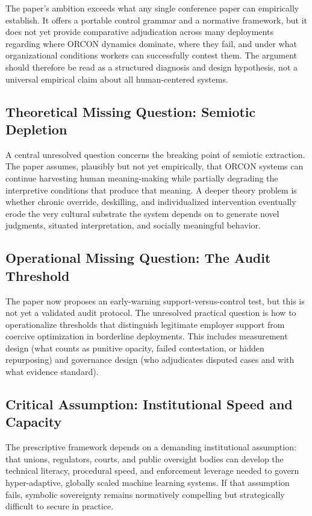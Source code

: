 \documentclass[runningheads]{llncs}
\begin{document}
The paper's ambition exceeds what any single conference paper can empirically establish. It offers a portable control grammar and a normative framework, but it does not yet provide comparative adjudication across many deployments regarding where ORCON dynamics dominate, where they fail, and under what organizational conditions workers can successfully contest them. The argument should therefore be read as a structured diagnosis and design hypothesis, not a universal empirical claim about all human-centered systems.

\subsection{Theoretical Missing Question: Semiotic Depletion}

A central unresolved question concerns the breaking point of semiotic extraction. The paper assumes, plausibly but not yet empirically, that ORCON systems can continue harvesting human meaning-making while partially degrading the interpretive conditions that produce that meaning. A deeper theory problem is whether chronic override, deskilling, and individualized intervention eventually erode the very cultural substrate the system depends on to generate novel judgments, situated interpretation, and socially meaningful behavior.

\subsection{Operational Missing Question: The Audit Threshold}

The paper now proposes an early-warning support-versus-control test, but this is not yet a validated audit protocol. The unresolved practical question is how to operationalize thresholds that distinguish legitimate employer support from coercive optimization in borderline deployments. This includes measurement design (what counts as punitive opacity, failed contestation, or hidden repurposing) and governance design (who adjudicates disputed cases and with what evidence standard).

\subsection{Critical Assumption: Institutional Speed and Capacity}

The prescriptive framework depends on a demanding institutional assumption: that unions, regulators, courts, and public oversight bodies can develop the technical literacy, procedural speed, and enforcement leverage needed to govern hyper-adaptive, globally scaled machine learning systems. If that assumption fails, symbolic sovereignty remains normatively compelling but strategically difficult to secure in practice.
\end{document}
